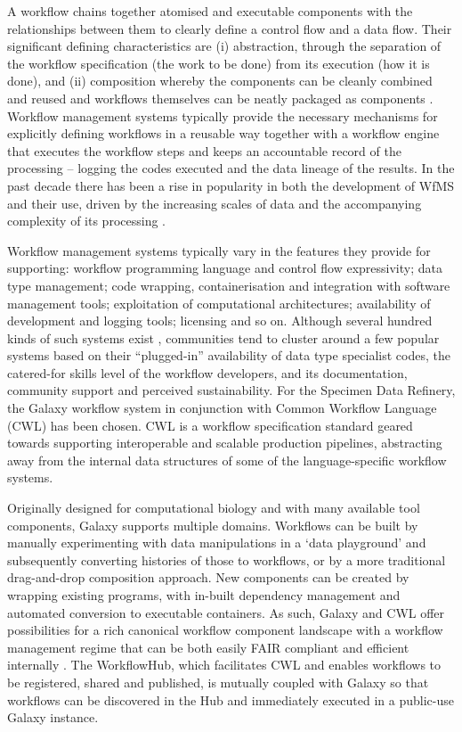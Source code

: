 A workflow chains together atomised and executable components with the
relationships between them to clearly define a control flow and a data
flow. Their significant defining characteristics are (i) abstraction,
through the separation of the workflow specification (the work to be
done) from its execution (how it is done), and (ii) composition whereby
the components can be cleanly combined and reused and workflows
themselves can be neatly packaged as components \cite{Atkinson 2017}. Workflow
management systems typically provide the necessary mechanisms for
explicitly defining workflows in a reusable way together with a workflow
engine that executes the workflow steps and keeps an accountable record
of the processing -- logging the codes executed and the data lineage of
the results. In the past decade there has been a rise in popularity in
both the development of WfMS and their use, driven by the increasing
scales of data and the accompanying complexity of its processing
\cite{Atkinson 2017}.

Workflow management systems typically vary in the features they provide
for supporting: workflow programming language and control flow
expressivity; data type management; code wrapping, containerisation and
integration with software management tools; exploitation of
computational architectures; availability of development and logging
tools; licensing and so on. Although several hundred kinds of such
systems exist \cite{Amstutz 2021}, communities tend to cluster around a few popular
systems based on their ``plugged-in'' availability of data type
specialist codes, the catered-for skills level of the workflow
developers, and its documentation, community support and perceived
sustainability. For the Specimen Data Refinery, the Galaxy workflow
system \cite{Afgan 2018} in conjunction with Common Workflow Language (CWL)
\cite{Crusoe 2022} has been chosen. CWL is a workflow specification standard
geared towards supporting interoperable and scalable production
pipelines, abstracting away from the internal data structures of some of
the language-specific workflow systems.

Originally designed for computational biology and with many available
tool components, Galaxy \cite{Afgan 2018} supports multiple domains. Workflows
can be built by manually experimenting with data manipulations in a
`data playground' and subsequently converting histories of those to
workflows, or by a more traditional drag-and-drop composition approach.
New components can be created by wrapping existing programs, with
in-built dependency management and automated conversion to executable
containers. As such, Galaxy and CWL offer possibilities for a rich
canonical workflow component landscape with a workflow management regime
that can be both easily FAIR compliant and efficient internally
\cite{ch8-27}. The WorkflowHub, which facilitates CWL and enables workflows
to be registered, shared and published, is mutually coupled with Galaxy
so that workflows can be discovered in the Hub and immediately executed
in a public-use Galaxy instance.

